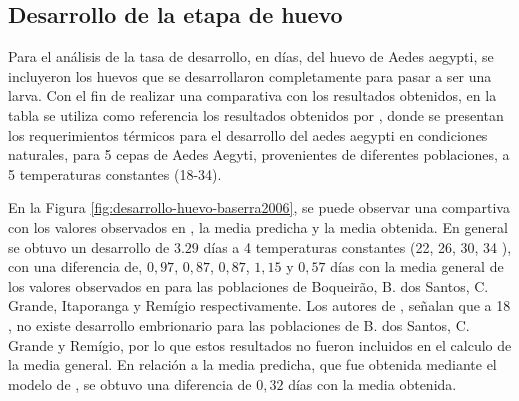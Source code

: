 \subsection{Desarrollo de la etapa de huevo}
Para el análisis de la tasa de desarrollo, en días, del huevo de Aedes aegypti, se incluyeron
los huevos que se desarrollaron completamente para pasar a ser una larva. Con el fin de realizar
una comparativa con los resultados obtenidos, en la tabla \cite{tab:desarrollo-huevo-test} se
utiliza como referencia los resultados obtenidos por \cite{BESERRA2006}, donde se presentan los
requerimientos térmicos para el desarrollo del aedes aegypti en condiciones naturales, para 5
cepas de Aedes Aegyti, provenientes de diferentes  poblaciones, a 5 temperaturas constantes
(18-34\textcelsius).

En la Figura \ref{fig:desarrollo-huevo-baserra2006}, se puede observar una compartiva con los
valores observados en \cite{BESERRA2006}, la media predicha y la media obtenida. En general se
obtuvo un desarrollo de $3.29$ días a 4 temperaturas constantes (22, 26, 30, 34 \textcelsius), con
una diferencia de, $0,97$, $0,87$, $0,87$, $1,15$ y $0,57$ días con la media general de los
valores observados en \cite{BESERRA2006} para las poblaciones de Boqueirão, B. dos Santos, C.
Grande, Itaporanga y Remígio respectivamente. Los autores de \cite{BESERRA2006}, señalan que a
18 \textcelsius, no existe desarrollo embrionario para las poblaciones de B. dos Santos, C. Grande
y Remígio, por lo que estos resultados no fueron incluidos en el calculo de la media general. En
relación a la media predicha, que fue obtenida mediante el modelo de \cite{sharpe1977reaction}, se
obtuvo una diferencia de $0,32$ días con la media obtenida.

